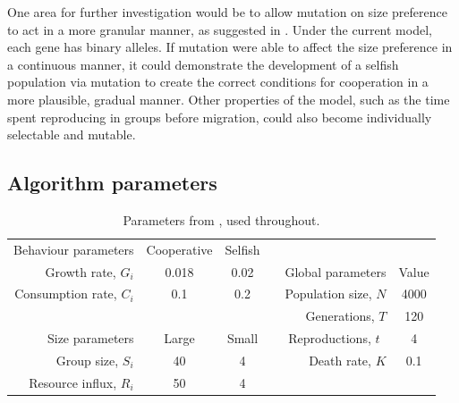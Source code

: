 \documentclass[11pt]{article}
\begin{document}
One area for further investigation would be to allow mutation on size preference to act in a more granular manner, as suggested in \citet{thesis}. Under the current model, each gene has binary alleles. If mutation were able to affect the size preference in a continuous manner, it could demonstrate the development of a selfish population via mutation to create the correct conditions for cooperation in a more plausible, gradual manner. Other properties of the model, such as the time spent reproducing in groups before migration, could also become individually selectable and mutable.


{}

\newpage
\begin{appendices}
\section{Algorithm parameters}
\label{app:parameters}
\vspace{-.5cm}
\begin{table}[!ht]
  \centering
  \begin{tabular}{r|c|ccr|c}
  Behaviour parameters  & Cooperative & Selfish &  & \multicolumn{1}{c}{} & \\ \cline{1-3}
  Growth rate, $G_i$      & 0.018     & 0.02    &  & Global parameters  & Value\\ \cline{5-6}
  Consumption rate, $C_i$   & 0.1     & 0.2   &  & Population size, $N$ & 4000\\
  \multicolumn{1}{r}{} & \multicolumn{1}{c}{} & \multicolumn{1}{c}{} &  & Generations, $T$ & 120 \\
  Size parameters   & Large     & Small   &  & Reproductions, $t$~    & 4\\ \cline{1-3}
  Group size, $S_i$     & 40      & 4     &  & Death rate, $K$ & 0.1\\
  Resource influx, $R_i$    & 50      & 4     &  & \multicolumn{1}{c}{} & \\
  \end{tabular}
  \caption{Parameters from \cite{orig}, used throughout.}
  \label{table:param}
\end{table}


\end{appendices}
\end{document}
